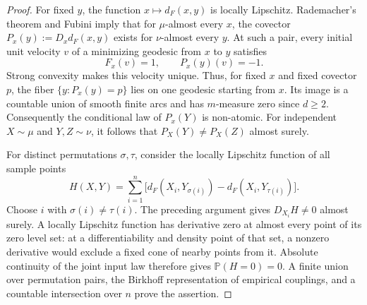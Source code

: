 \documentclass[11pt,reqno]{amsart}
\theoremstyle{definition}
\theoremstyle{remark}
\numberwithin{equation}{section}
\begin{document}
\begin{proof}
For fixed \(y\), the function \(x\mapsto d_F(x,y)\) is locally
Lipschitz. Rademacher's theorem and Fubini imply that for
\(\mu\)-almost every \(x\), the covector
\(P_x(y):=D_xd_F(x,y)\) exists for \(\nu\)-almost every \(y\).
At such a pair, every initial unit velocity \(v\) of a minimizing
geodesic from \(x\) to \(y\) satisfies
\[
F_x(v)=1,\qquad P_x(y)(v)=-1.
\]
Strong convexity makes this velocity unique. Thus, for fixed \(x\)
and fixed covector \(p\), the fiber \(\{y:P_x(y)=p\}\) lies on
one geodesic starting from \(x\). Its image is a countable union
of smooth finite arcs and has \(m\)-measure zero since \(d\ge2\).
Consequently the conditional law of \(P_x(Y)\) is non-atomic.
For independent \(X\sim\mu\) and \(Y,Z\sim\nu\), it follows that
\(P_X(Y)\ne P_X(Z)\) almost surely.

For distinct permutations \(\sigma,\tau\), consider the locally
Lipschitz function of all sample points
\[
H(X,Y)=\sum_{i=1}^n
\bigl[d_F(X_i,Y_{\sigma(i)})-d_F(X_i,Y_{\tau(i)})\bigr].
\]
Choose \(i\) with \(\sigma(i)\ne\tau(i)\). The preceding argument
gives \(D_{X_i}H\ne0\) almost surely. A locally Lipschitz function
has derivative zero at almost every point of its zero level set:
at a differentiability and density point of that set, a nonzero
derivative would exclude a fixed cone of nearby points from it.
Absolute continuity of the joint input law therefore gives
\(\mathbb P(H=0)=0\). A finite union over permutation pairs,
the Birkhoff representation of empirical couplings, and a countable
intersection over \(n\) prove the assertion.
\end{proof}
\end{document}
